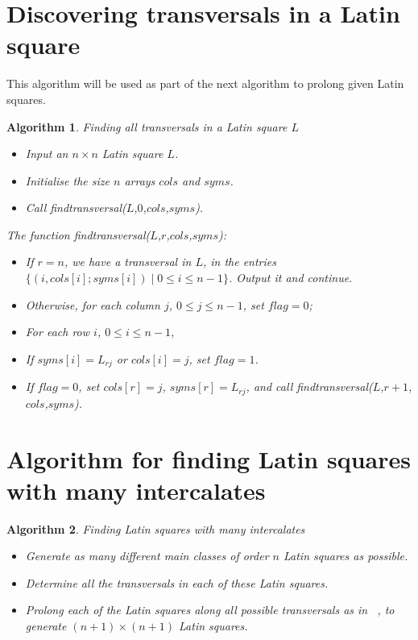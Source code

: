 \documentclass[12pt]{report}
\newtheorem{algorithm}{Algorithm}
\begin{document}
\section{Discovering transversals in a Latin square}
This algorithm will be used as part of the next algorithm to
prolong given Latin squares.

\begin{algorithm}{Finding all transversals in a Latin square $L$}
\begin{itemize}
\item Input an $n \times n$ Latin square $L$.
\item Initialise the size $n$ arrays $cols$ and $syms$.
\item Call findtransversal($L$,$0$,$cols$,$syms$).
\end{itemize}

The function findtransversal($L$,$r$,$cols$,$syms$):
\begin{itemize}
\item If $r = n$, we have a transversal in $L$, in the entries 
$\{ (i,cols[i];syms[i]) \mid 0 \leq i \leq n-1 \}$.  Output it and continue.
\item Otherwise, for each column $j$, $0 \leq j \leq n-1$,  set $flag = 0$;
\item For each row $i$, $0 \leq i \leq n-1$,
\item[-] If $syms[i] = L_{rj}$ or $cols[i] = j$, set $flag = 1$.
\item If $flag=0$, set $cols[r]=j$, $syms[r]=L_{rj}$, and call findtransversal($L$,$r+1$,$cols$,$syms$).
\end{itemize}
\end{algorithm}

\section{Algorithm for finding Latin squares with many intercalates}
\begin{algorithm}{Finding Latin squares with many intercalates}
\label{many}
\begin{itemize}
\item Generate as many different main classes of order $n$ Latin squares as possible.
\item Determine all the transversals in each of these Latin squares.
\item Prolong each of the Latin squares along all possible transversals as in ~\cite{MR2000g:05035},
to generate $(n+1) \times (n+1)$ Latin squares.
\end{itemize}
\end{algorithm}
\end{document}
